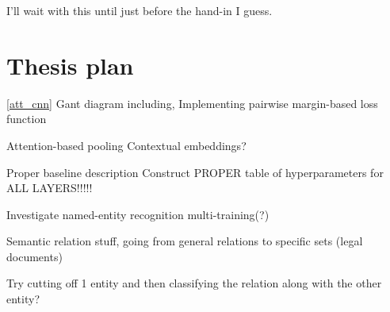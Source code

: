 \documentclass{article}
\begin{document}
I'll wait with this until just before the hand-in I guess.


\section{Thesis plan}

\ref{att_cnn}
\cite{att_cnn}
Gant diagram including,
Implementing pairwise margin-based loss function

Attention-based pooling
Contextual embeddings?

Proper baseline description
Construct PROPER table of hyperparameters for ALL LAYERS!!!!!

Investigate named-entity recognition multi-training(?)

Semantic relation stuff, going from general relations to specific
sets (legal documents)

Try cutting off 1 entity and then classifying the relation along with the other entity?






    
\end{document}
